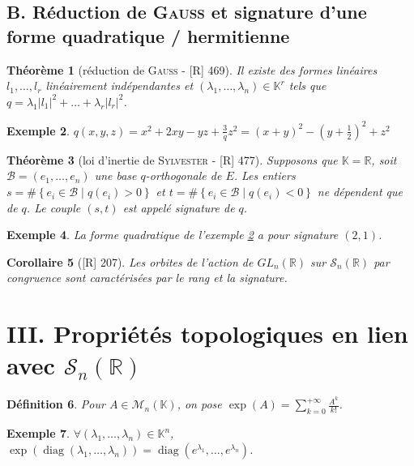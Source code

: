\documentclass[10pt, a4paper, parskip=full, twoside, twocolumn]{report}
\newtheorem{definition}{Définition}
\newtheorem{theorem}[definition]{Théorème}
\newtheorem{corollary}[definition]{Corollaire}
\newtheorem{example}[definition]{Exemple}
\newcommand{\IK}{\mathbb{K}}
\newcommand{\IR}{\mathbb{R}}
\newcommand{\M}{\mathcal{M}}
\newcommand{\B}{\mathcal{B}}
\DeclareMathOperator{\diag}{diag}
\begin{document}
\subsection*{B. Réduction de \textsc{Gauss} et signature d'une forme quadratique / hermitienne}

\begin{theorem}[réduction de \textsc{Gauss} - \textnormal{[R] 469}]
	Il existe des formes linéaires $l_1,\dots, l_r$ linéairement indépendantes et $(\lambda_1,\dots,\lambda_n)\in\IK^r$ tels que $q = \lambda_1 \vert l_1\vert^2 + \dots + \lambda_r \vert l_r\vert^2$.
\end{theorem}

\begin{example}
	\label{157ex19}
	$q(x,y,z) = x^2+2xy-yz+\frac{3}{q}z^2=(x+y)^2 -(y+\frac{1}{2})^2 + z^2$
\end{example}

\begin{theorem}[loi d'inertie de \textsc{Sylvester} - \textnormal{[R] 477}]
	Supposons que $\IK = \IR$, soit $\B=(e_1,\dots,e_n)$ une base $q$-orthogonale de $E$.
	Les entiers $s = \#\left\{e_i\in\B \mid q(e_i)> 0\right\}$ et $t = \#\left\{e_i\in\B\mid q(e_i)<0\right\}$
	ne dépendent que de $q$. Le couple $(s,t)$ est appelé \emph{signature de $q$}.
\end{theorem}

\begin{example}
	La forme quadratique de l'exemple \ref{157ex19} a pour signature $(2,1)$.
\end{example}

\begin{corollary}[\textnormal{[R] 207}]
	Les orbites de l'action de $GL_n(\IR)$ sur $\mathcal{S}_n(\IR)$ par congruence sont caractérisées par le rang et la signature.
\end{corollary}

\section*{III. Propriétés topologiques en lien avec $\mathcal{S}_n(\IR)$}

\begin{definition}
	Pour $A\in\M_n(\IK)$, on pose $\exp(A)=\sum_{k=0}^{+\infty} \frac{A^k}{k!}$.
\end{definition}

\begin{example}
	$\forall (\lambda_1,\dots,\lambda_n)\in\IK^n$, $\exp(\diag(\lambda_1,\dots,\lambda_n)) = \diag(e^{\lambda_1},\dots, e^{\lambda_n})$.
\end{example}
\end{document}

